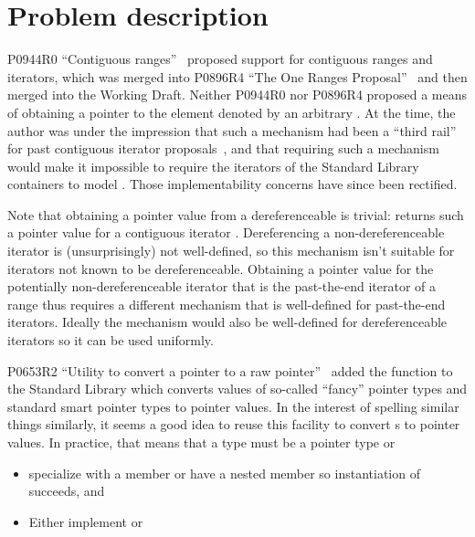 \chapter{Problem description}

P0944R0 ``Contiguous ranges''~\cite{P0944} proposed support for contiguous
ranges and iterators, which was merged into P0896R4 ``The One Ranges
Proposal''~\cite{P0896R4} and then merged into the Working Draft. Neither
P0944R0 nor P0896R4 proposed a means of obtaining a pointer to the element
denoted by an arbitrary . At the time, the author was
under the impression that such a mechanism had been a ``third rail'' for past
contiguous iterator proposals~\cite{N4183}, and that requiring such a mechanism
would make it impossible to require the iterators of the Standard Library
containers to model . Those implementability concerns
have since been rectified.

Note that obtaining a pointer value from a dereferenceable
 is trivial:  returns such a
pointer value for a contiguous iterator . Dereferencing a
non-dereferenceable iterator is (unsurprisingly) not well-defined, so this
mechanism isn't suitable for iterators not known to be dereferenceable.
Obtaining a pointer value for the potentially non-dereferenceable iterator
 that is the past-the-end iterator of a range  thus
requires a different mechanism that is well-defined for past-the-end iterators.
Ideally the mechanism would also be well-defined for dereferenceable iterators
so it can be used uniformly.

P0653R2 ``Utility to convert a pointer to a raw pointer''~\cite{P0653R2} added
the function  to the Standard
Library which converts values of so-called ``fancy'' pointer types and standard
smart pointer types to pointer values. In the interest of spelling similar
things  similarly, it seems a good idea to reuse this facility to convert
s to pointer values. In practice, that means that a
type  must be a pointer type or
\begin{itemize}
\item specialize  with a member 
  or have a nested member 
  so instantiation of  succeeds, and
\item Either implement  or
\end{itemize}


